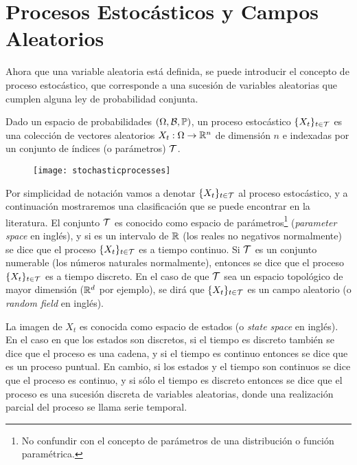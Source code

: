 \section{Procesos Estocásticos y Campos Aleatorios}
Ahora que una variable aleatoria está definida, se puede introducir el concepto de proceso estocástico, que corresponde a una sucesión de variables aleatorias que cumplen alguna ley de probabilidad conjunta.

\begin{definition}
	Dado un espacio de probabilidades \((\Omega, \mathcal{B}, \mathbb{P})\), un proceso estocástico \(\{X_t\}_{t \in \mathcal{T}}\) es una colección de vectores aleatorios \(X_t : \Omega \to \mathbb{R}^{n}\) de dimensión \(n\) e indexadas por un conjunto de índices (o parámetros) \(\mathcal{T}\).
\end{definition}

\begin{figure}[h]
	\centering
	\texttt{[image: stochasticprocesses]}
\end{figure}

Por simplicidad de notación vamos a denotar \(\{X_t\}_{t \in \mathcal{T}}\) al proceso estocástico, y a continuación mostraremos una clasificación que se puede encontrar en la literatura. El conjunto \(\mathcal{T}\) es conocido como espacio de parámetros\footnote{No confundir con el concepto de parámetros de una distribución o función paramétrica.} (\emph{parameter space} en inglés), y si es un intervalo de \(\mathbb{R}\) (los reales no negativos normalmente) se dice que el proceso \(\{X_t\}_{t \in \mathcal{T}}\) es a tiempo continuo. Si \(\mathcal{T}\) es un conjunto numerable (los números naturales normalmente), entonces se dice que el proceso \(\{X_t\}_{t \in \mathcal{T}}\) es a tiempo discreto. En el caso de que \(\mathcal{T}\) sea un espacio topológico de mayor dimensión (\(\mathbb{R}^{d}\) por ejemplo), se dirá que \(\{X_t\}_{t \in \mathcal{T}}\) es un campo aleatorio (o \emph{random field} en inglés).

La imagen de \(X_t\) es conocida como espacio de estados (o \emph{state space} en inglés). En el caso en que los estados son discretos, si el tiempo es discreto también se dice que el proceso es una cadena, y si el tiempo es continuo entonces se dice que es un proceso puntual. En cambio, si los estados y el tiempo son continuos se dice que el proceso es continuo, y si sólo el tiempo es discreto entonces se dice que el proceso es una sucesión discreta de variables aleatorias, donde una realización parcial del proceso se llama serie temporal.

